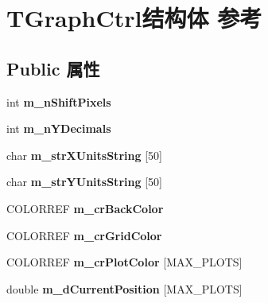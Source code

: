 \hypertarget{struct_t_graph_ctrl}{}\section{T\+Graph\+Ctrl结构体 参考}
\label{struct_t_graph_ctrl}
\subsection*{Public 属性}
\begin{DoxyCompactItemize}
\item 
\mbox{\label{struct_t_graph_ctrl_af2d8d527dc44faea9e17c2528d7e4bc9}} 
int {\bfseries m\+\_\+n\+Shift\+Pixels}
\item 
\mbox{\label{struct_t_graph_ctrl_ad19eb0c0f46327ae679edad6edff9d4b}} 
int {\bfseries m\+\_\+n\+Y\+Decimals}
\item 
\mbox{\label{struct_t_graph_ctrl_a603fb0dcc1ba49d31fca7097eb81e3ca}} 
char {\bfseries m\+\_\+str\+X\+Units\+String} \mbox{[}50\mbox{]}
\item 
\mbox{\label{struct_t_graph_ctrl_abc4902098b9ffbdb594104732277ffa1}} 
char {\bfseries m\+\_\+str\+Y\+Units\+String} \mbox{[}50\mbox{]}
\item 
\mbox{\label{struct_t_graph_ctrl_a567712734994d40bad1df6217a23c7d9}} 
C\+O\+L\+O\+R\+R\+EF {\bfseries m\+\_\+cr\+Back\+Color}
\item 
\mbox{\label{struct_t_graph_ctrl_a0440e832af5234bf9ef6b6661a4137c0}} 
C\+O\+L\+O\+R\+R\+EF {\bfseries m\+\_\+cr\+Grid\+Color}
\item 
\mbox{\label{struct_t_graph_ctrl_ad338192a89f4d967b3ed5e81da15ebf5}} 
C\+O\+L\+O\+R\+R\+EF {\bfseries m\+\_\+cr\+Plot\+Color} \mbox{[}M\+A\+X\+\_\+\+P\+L\+O\+TS\mbox{]}
\item 
\mbox{\label{struct_t_graph_ctrl_a4ad82e9b2adcf4b7b4a9b10a9c3732b5}} 
double {\bfseries m\+\_\+d\+Current\+Position} \mbox{[}M\+A\+X\+\_\+\+P\+L\+O\+TS\mbox{]}
\item 
\mbox{\label{struct_t_graph_ctrl_a1020eb9e4946f77aff6baf5163b2ed17}} 

\end{DoxyCompactItemize}
